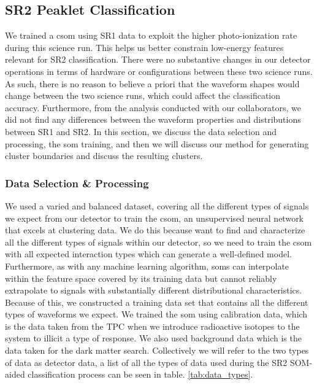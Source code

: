 \subsection{SR2 Peaklet Classification}

We trained a  \acrfull{csom} using SR1 data to exploit the higher photo-ionization rate during this science run. This helps us better constrain low-energy features relevant for SR2 classification.
There were no substantive changes in our detector operations in terms of hardware or configurations between these two science runs. As such, there is no reason to believe a priori that the waveform shapes would change between the two science runs, which could affect the classification accuracy.
Furthermore, from the analysis conducted with our collaborators, we did not find any differences between the waveform properties and distributions between SR1 and SR2.
In this section, we discuss the data selection and processing, the \acrshort{som} training, and then we will discuss our method for generating cluster boundaries and discuss the resulting clusters.

\subsubsection{Data Selection \& Processing}
\label{sec5:pre_processing}

We used a varied and balanced dataset, covering all the different types of signals we expect from our detector to train the \acrshort{csom}, an unsupervised neural network that excels at clustering data. We do this because want to find and characterize all the different types of signals within our detector, so we need to train the \acrshort{csom} with all expected interaction types which can generate a well-defined model.
Furthermore, as with any machine learning algorithm, \acrshort{som}s can interpolate within the feature space covered by its training data but cannot reliably extrapolate to signals with substantially different distributional characteristics.  Because of this, we constructed a training data set that contains all the different types of waveforms we expect. We trained the \acrshort{som} using calibration data, which is the data taken from the TPC when we introduce radioactive isotopes to the system to illicit a type of response. We also used background data which is the data taken for the dark matter search. Collectively we will refer to the two types of data as detector data, a list of all the types of data used during the SR2 SOM-aided classification process can be seen in table. \ref{tab:data_types}.

